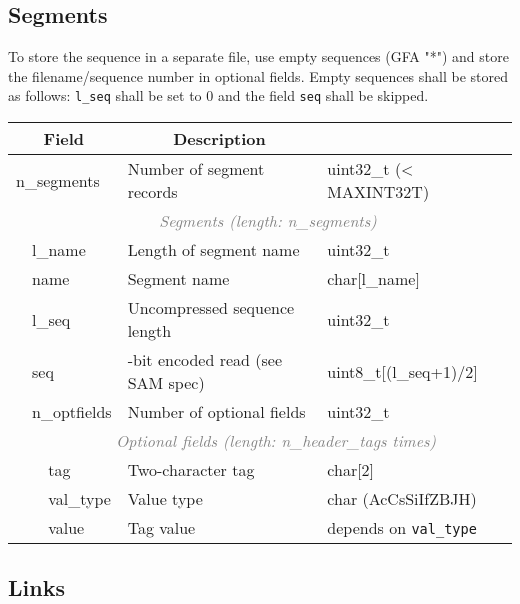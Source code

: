 \documentclass[12pt]{article}
\begin{document}
\newpage

\subsection*{Segments}

To store the sequence in a separate file, use empty sequences (GFA "*")
and store the filename/sequence number in optional fields.
Empty sequences shall be stored as follows: \texttt{l\_seq} shall be set
to 0 and the field \texttt{seq} shall be skipped.
\vspace{0.5cm}

\begin{tabular}{|ll|>{\sffamily}l|p{6.5cm}|>{\ttfamily}l|}
\hline
\multicolumn{3}{|c|}{\textbf{Field}} &
\multicolumn{1}{c|}{\textbf{Description}} &
\multicolumn{1}{c|}{\textbf{Type}} \\
\hline
\multicolumn{3}{|l|}{\sf n\_segments}
& Number of segment records & uint32\_t (< MAXINT32T) \\
\hline
\multicolumn{1}{|l}{} &
\multicolumn{4}{c|}{\textcolor{gray}{\textit{Segments (length: n\_segments)}}}\\
\cline{2-5}
& \multicolumn{2}{|l|}{\sf l\_name} & Length of segment name  & uint32\_t \\
\cline{2-5}
& \multicolumn{2}{|l|}{\sf name} & Segment name & char[l\_name] \\
\cline{2-5}
& \multicolumn{2}{|l|}{\sf l\_seq} & Uncompressed sequence length & uint32\_t \\
\cline{2-5}
& \multicolumn{2}{|l|}{\sf seq} & 4-bit encoded read (see SAM spec) &
  uint8\_t[(l\_seq+1)/2] \\
\cline{2-5}
& \multicolumn{2}{|l|}{\sf n\_optfields}
  & Number of optional fields & uint32\_t \\
\cline{2-5}
\multicolumn{2}{|l}{} &
\multicolumn{3}{c|}{\textcolor{gray}{\textit{Optional fields
(length: n\_header\_tags times)}}}\\
\cline{3-5}
& & tag & Two-character tag & char[2] \\
\cline{3-5}
& & val\_type & Value type & char (AcCsSiIfZBJH) \\
\cline{3-5}
& & value & Tag value &
depends on {\tt val\_type} \\
\hline
\end{tabular}

\vspace{0.5cm}
\subsection*{Links}
\end{document}
